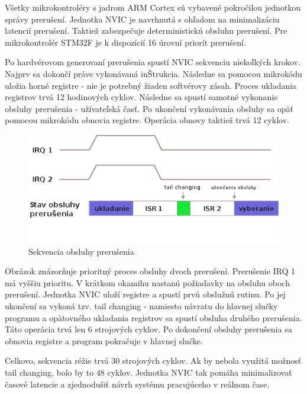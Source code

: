 Všetky mikrokontroléry s jadrom ARM Cortex sú vybavené pokročilou jednotkou správy prerušení. Jednotka NVIC je navrhnutá s ohľadom na minimalizáciu latencií prerušení. Taktiež zabezpečuje deterministickú obsluhu prerušení. Pre mikrokontrolér STM32F je k dispozícií 16 úrovní priorít prerušení.

Po hardvérovom generovaní prerušenia spustí NVIC sekvenciu niekoľkých krokov. Najprv sa dokončí práve vykonávaná inŠtrukcia. Následne sa pomocou mikrokódu uložia horné registre - nie je potrebný žiaden softvérovy zásah. Proces ukladania registrov trvá 12 hodinových cyklov. Následne sa spustí samotné vykonanie obsluhy prerušenia - užívateľská časť. Po ukončení vykonávania obsluhy sa opäť pomocou mikrokódu obnovia registre. Operácia obnovy taktiež trvá 12 cyklov.


\begin{figure}[ht]
\begin{center}
\begin{minipage}{1.1\linewidth}
\begin{center}
\includegraphics[width=.75\textwidth]{images/irq_sequence.png}
\caption{Sekvencia obsluhy prerušenia}
\label{obr2}
\end{center}
\end{minipage}
\end{center}
\end{figure}

Obrázok znázorňuje prioritný proces obsluhy dvoch prerušení. Prerušenie IRQ 1 má vyššiu prioritu. V krátkom okamihu nastanú požiadavky na obsluhu oboch prerušení. Jednotka NVIC uloží registre a spustí prvú obslužnú rutinu. Po jej ukončení sa vykoná tzv. tail changing - namiesto návratu do hlavnej slučky programu a opätovného ukladania registrov sa spustí obsluha druhého prerušenia. Táto operácia trvá len 6 strojových cyklov. Po dokončení obsluhy prerušenia sa obnovia registre a program pokračuje v hlavnej slučke.

Celkovo, sekvencia réžie trvá 30 strojových cyklov. Ak by nebola využitá možnosť tail changing, bolo by to 48 cyklov. Jednotka NVIC tak pomáha minimalizovať časové latencie a zjednodušiť návrh systému pracujúceho v reálnom čase.


